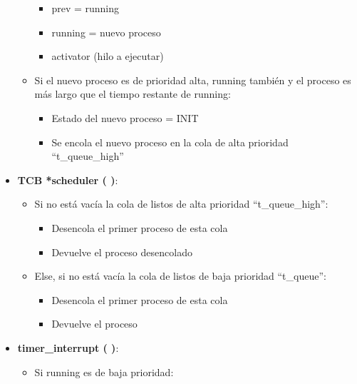 \documentclass[10pt, spanish, pdftex]{template/UC3M_document}
\begin{document}
\begin{itemize}
\begin{itemize}
\begin{itemize}
            \item prev = running
            \item running = nuevo proceso
            \item activator (hilo a ejecutar)
        \end{itemize}
        \item Si el nuevo proceso es de prioridad alta, running también y el proceso es más largo que el tiempo restante de running:
        \vspace{-2mm}
    \begin{itemize}
     \setlength{\itemsep}{-1.5mm}
            \item Estado del nuevo proceso = INIT
            \item Se encola el nuevo proceso en la cola de alta prioridad “t\_queue\_high” 
        \end{itemize}
    \end{itemize}
    \item \textbf{TCB *scheduler ( )}:
    \vspace{-2mm}
    \begin{itemize}
     \setlength{\itemsep}{-1.5mm}
        \item Si no está vacía la cola de listos de alta prioridad “t\_queue\_high”:
        \vspace{-2mm}
    \begin{itemize}
     \setlength{\itemsep}{-1.5mm}
            \item Desencola el primer proceso de esta cola
            \item Devuelve el proceso desencolado
        \end{itemize}
        \item Else, si no está vacía la cola de listos de baja prioridad “t\_queue”:
        \vspace{-2mm}
    \begin{itemize}
     \setlength{\itemsep}{-1.5mm}
            \item Desencola el primer proceso de esta cola
            \item Devuelve el proceso
        \end{itemize}
    \end{itemize}
    \item \textbf{timer\_interrupt ( )}:
    \vspace{-2mm}
    \begin{itemize}
     \setlength{\itemsep}{-1.5mm}
        \item Si running es de baja prioridad:

\end{itemize}
\end{itemize}
\end{document}

